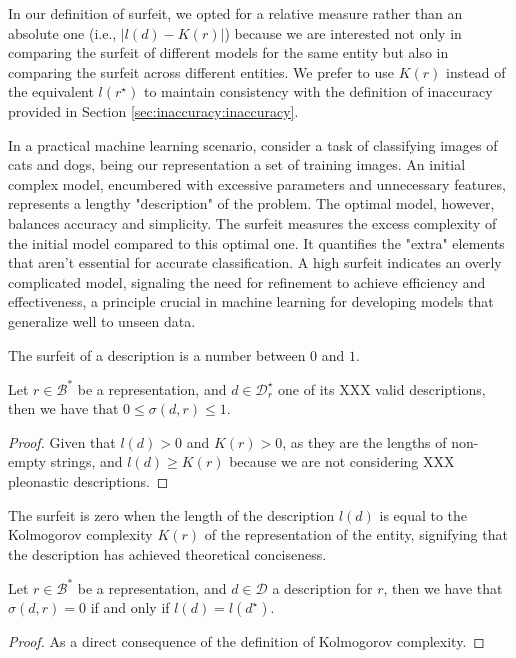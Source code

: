 In our definition of surfeit, we opted for a relative measure rather than an absolute one (i.e., $| l(d) - K(r) |$) because we are interested not only in comparing the surfeit of different models for the same entity but also in comparing the surfeit across different entities. We prefer to use $K(r)$ instead of the equivalent $l \left( r^\star \right)$ to maintain consistency with the definition of inaccuracy provided in Section \ref{sec:inaccuracy:inaccuracy}.

\begin{example}
In a practical machine learning scenario, consider a task of classifying images of cats and dogs, being our representation a set of training images. An initial complex model, encumbered with excessive parameters and unnecessary features, represents a lengthy "description" of the problem. The optimal model, however, balances accuracy and simplicity. The surfeit measures the excess complexity of the initial model compared to this optimal one. It quantifies the "extra" elements that aren't essential for accurate classification. A high surfeit indicates an overly complicated model, signaling the need for refinement to achieve efficiency and effectiveness, a principle crucial in machine learning for developing models that generalize well to unseen data.
\end{example}

The surfeit of a description is a number between $0$ and $1$.

\begin{proposition}
\label{prop:range_redundancy}
Let $r \in \mathcal{B}^\ast$ be a representation, and $d \in \mathcal{D}^\star_r$ one of its {\color{red} XXX valid descriptions}, then we have that $0 \leq \sigma(d, r) \leq 1$.
\end{proposition}
\begin{proof}
Given that $l\left( d \right)>0$ and $K\left( r \right)>0$, as they are the lengths of non-empty strings, and $l\left( d \right) \geq K\left( r \right)$ because we are not considering {\color{red} XXX pleonastic descriptions}.
\end{proof}

The surfeit is zero when the length of the description \(l(d)\) is equal to the Kolmogorov complexity \(K(r)\) of the representation of the entity, signifying that the description has achieved theoretical conciseness.

\begin{proposition}
\label{prop:zero_surfeit}
Let $r \in \mathcal{B}^\ast$ be a representation, and $d \in \mathcal{D}$ a description for $r$, then we have that  $\sigma(d, r) = 0$ if and only if $l(d) = l(d^\star)$.
\end{proposition}
\begin{proof}
As a direct consequence of the definition of Kolmogorov complexity.
\end{proof}

